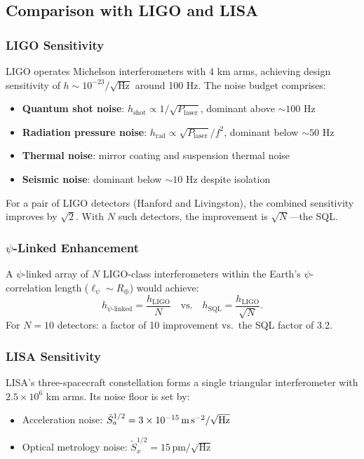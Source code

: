 \documentclass[12pt,a4paper]{article}
\theoremstyle{remark}
\begin{document}
\subsection{Comparison with LIGO and LISA}\label{sec:ligo-comparison}

\subsubsection{LIGO Sensitivity}

LIGO operates Michelson interferometers with 4 km arms, achieving design
sensitivity of $h \sim 10^{-23}/\sqrt{\text{Hz}}$ around 100 Hz. The
noise budget comprises:
\begin{itemize}
\item \textbf{Quantum shot noise}: $h_{\text{shot}} \propto 1/\sqrt{P_{\text{laser}}}$,
dominant above $\sim 100$ Hz
\item \textbf{Radiation pressure noise}: $h_{\text{rad}} \propto \sqrt{P_{\text{laser}}}/f^2$,
dominant below $\sim 50$ Hz
\item \textbf{Thermal noise}: mirror coating and suspension thermal noise
\item \textbf{Seismic noise}: dominant below $\sim 10$ Hz despite isolation
\end{itemize}

For a pair of LIGO detectors (Hanford and Livingston), the combined
sensitivity improves by $\sqrt{2}$. With $N$ such detectors, the
improvement is $\sqrt{N}$---the SQL.

\subsubsection{$\psi$-Linked Enhancement}

A $\psi$-linked array of $N$ LIGO-class interferometers within the
Earth's $\psi$-correlation length ($\ell_\psi \sim R_\oplus$) would achieve:
\begin{equation}
h_{\psi\text{-linked}} = \frac{h_{\text{LIGO}}}{N}\quad \text{vs.}\quad
h_{\text{SQL}} = \frac{h_{\text{LIGO}}}{\sqrt{N}}.
\label{eq:ligo-enhancement}
\end{equation}
For $N = 10$ detectors: a factor of 10 improvement vs.\ the SQL factor
of 3.2.

\subsubsection{LISA Sensitivity}

LISA's three-spacecraft constellation forms a single triangular
interferometer with $2.5 \times 10^6$ km arms. Its noise floor is set by:
\begin{itemize}
\item Acceleration noise:
$\tilde{S}_a^{1/2} = 3 \times 10^{-15}\,\text{m\,s}^{-2}/\sqrt{\text{Hz}}$
\item Optical metrology noise:
$\tilde{S}_x^{1/2} = 15\,\text{pm}/\sqrt{\text{Hz}}$
\end{itemize}
\end{document}
